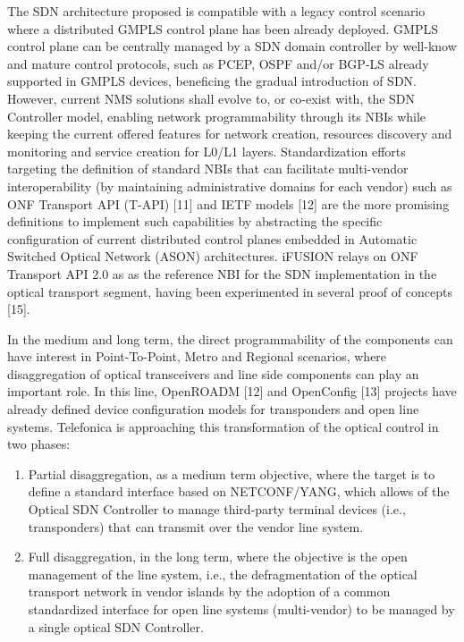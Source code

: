 \documentclass[a4paper,fleqn]{cas-dc}
\begin{document}
The SDN architecture proposed is compatible with a legacy control scenario where a distributed GMPLS control plane has been already deployed. GMPLS control plane can be centrally managed by a SDN domain controller by well-know and mature control protocols, such as PCEP, OSPF and/or BGP-LS already supported in GMPLS devices, beneficing the gradual introduction of SDN. However, current NMS solutions shall evolve to, or co-exist with, the SDN Controller model, enabling network programmability through its NBIs while keeping the current offered features for network creation, resources discovery and monitoring and service creation for L0/L1 layers. Standardization efforts targeting the definition of standard NBIs that can facilitate multi-vendor interoperability (by maintaining administrative domains for each vendor) such as ONF Transport API (T-API) [11] and IETF models [12] are the more promising definitions to implement such capabilities by abstracting the specific configuration of current distributed control planes embedded in Automatic Switched Optical Network (ASON) architectures. 
iFUSION relays on ONF Transport API 2.0 as as the reference NBI for the SDN implementation in the optical transport segment, having been experimented in several proof of concepts [15]. 

In the medium and long term, the direct programmability of the components can have interest in Point-To-Point, Metro and Regional scenarios, where disaggregation of optical transceivers and line side components can play an important role. In this line, OpenROADM [12] and OpenConfig [13] projects have already defined device configuration models for transponders and open line systems. Telefonica is approaching this transformation of the optical control in two phases:

\begin{enumerate}
    \item Partial disaggregation, as a medium term objective, where the target is to define a standard interface based on NETCONF/YANG, which allows of the Optical SDN Controller to manage third-party terminal devices (i.e., transponders) that can transmit over the vendor line system.
    
    \item Full disaggregation, in the long term, where the objective is the open management of the line system, i.e., the defragmentation of the optical transport network in vendor islands by the adoption of a common standardized interface for open line systems (multi-vendor) to be managed by a single optical SDN Controller.
\end{enumerate}
\end{document}
